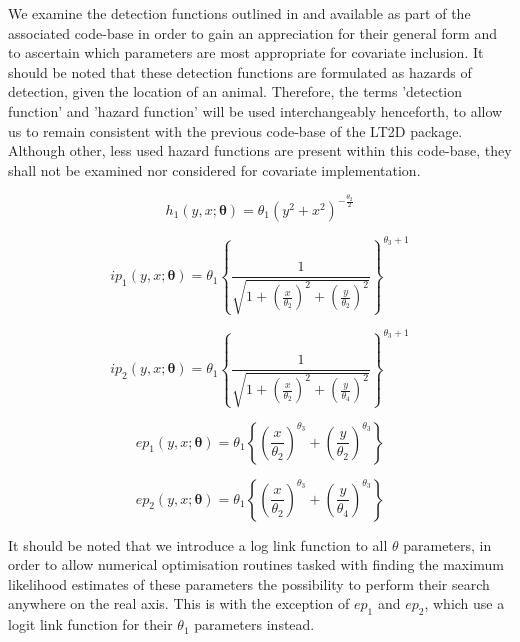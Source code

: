 \documentclass[11pt]{article}
\begin{document}
\begin{multicols}{2}
We examine the detection functions outlined in \cite{Borchers} and available as part of the associated code-base in order to gain an appreciation for their general form and to ascertain which parameters are most appropriate for covariate inclusion. It should be noted that these detection functions are formulated as hazards of detection, given the location of an animal. Therefore, the terms 'detection function' and 'hazard function' will be used interchangeably henceforth, to allow us to remain consistent with the previous code-base of the LT2D package. Although other, less used hazard functions are present within this code-base, they shall not be examined nor considered for covariate implementation.

\begingroup
\large

\begin{equation}
h_1\left(y,x;\boldsymbol{\theta}\right) = \theta_1\left(y^2+x^2\right)^{-\frac{\theta_2}{2}}
\end{equation}

\begin{equation}
ip_1\left(y,x;\boldsymbol{\theta}\right) = \theta_1\left\{\frac{1}{\sqrt{1+\left(\frac{x}{\theta_2}\right)^2+\left(\frac{y}{\theta_2}\right)^2}}\right\}^{\theta_3 + 1}
\end{equation}

\begin{equation}
ip_2\left(y,x;\boldsymbol{\theta}\right) = \theta_1\left\{\frac{1}{\sqrt{1+\left(\frac{x}{\theta_2}\right)^2+\left(\frac{y}{\theta_4}\right)^2}}\right\}^{\theta_3 + 1}
\end{equation}


\begin{equation}
ep_1\left(y,x;\boldsymbol{\theta}\right) = \theta_1\left\{\left(\frac{x}{\theta_2}\right)^{\theta_3}+\left(\frac{y}{\theta_2}\right)^{\theta_3}\right\}
\end{equation}

\begin{equation}
ep_2\left(y,x;\boldsymbol{\theta}\right) = \theta_1\left\{\left(\frac{x}{\theta_2}\right)^{\theta_3}+\left(\frac{y}{\theta_4}\right)^{\theta_3}\right\}
\end{equation}
\endgroup

It should be noted that we introduce a log link function to all $\theta$ parameters, in order to allow numerical optimisation routines tasked with finding the maximum likelihood estimates of these parameters the possibility to perform their search anywhere on the real axis. This is with the exception of $ep_1$ and $ep_2$, which use a logit link function for their $\theta_1$ parameters instead.


\end{multicols}
\end{document}
